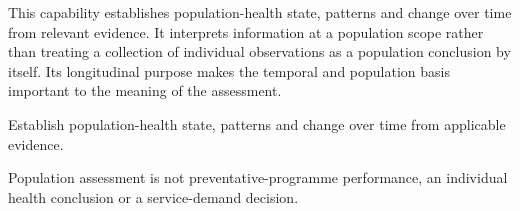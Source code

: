 This capability establishes population-health state, patterns and change over time from relevant evidence. It interprets information at a population scope rather than treating a collection of individual observations as a population conclusion by itself. Its longitudinal purpose makes the temporal and population basis important to the meaning of the assessment.



Establish population-health state, patterns and change over time from applicable evidence.



Population assessment is not preventative-programme performance, an individual health conclusion or a service-demand decision.


